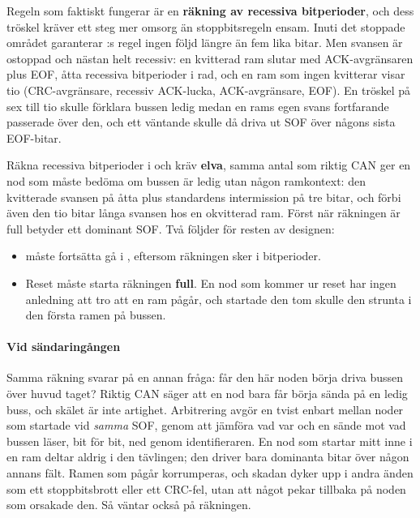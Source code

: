 Regeln som faktiskt fungerar är en \textbf{räkning av recessiva bitperioder}, och dess tröskel kräver
ett steg mer omsorg än stoppbitsregeln ensam. Inuti det stoppade området garanterar
:s regel ingen följd längre än fem lika bitar. Men svansen är ostoppad och
nästan helt recessiv: en kvitterad ram slutar med ACK-avgränsaren plus EOF, åtta recessiva
bitperioder i rad, och en ram som ingen kvitterar visar tio (CRC-avgränsare, recessiv ACK-lucka,
ACK-avgränsare, EOF). En tröskel på sex till tio skulle förklara bussen ledig medan en rams egen svans
fortfarande passerade över den, och ett väntande  skulle då driva ut SOF över någons
sista EOF-bitar.

Räkna recessiva bitperioder i  och kräv \textbf{elva}, samma antal som riktig CAN
ger en nod som måste bedöma om bussen är ledig utan någon ramkontext: den kvitterade svansen på åtta
plus standardens intermission på tre bitar, och förbi även den tio bitar långa svansen hos en
okvitterad ram. Först när räkningen är full betyder ett dominant  SOF. Två följder
för resten av designen:
\begin{itemize}
  \item {} måste fortsätta gå i , eftersom räkningen sker i
    bitperioder.
  \item Reset måste starta räkningen \textbf{full}. En nod som kommer ur reset har ingen anledning
    att tro att en ram pågår, och startade den tom skulle den strunta i den första ramen på bussen.
\end{itemize}

\paragraph{Vid sändaringången}
Samma räkning svarar på en annan fråga: får den här noden börja driva bussen över huvud taget? Riktig
CAN säger att en nod bara får börja sända på en ledig buss, och skälet är inte artighet. Arbitrering
avgör en tvist enbart mellan noder som startade vid \emph{samma} SOF, genom att jämföra vad var och
en sände mot vad bussen läser, bit för bit, ned genom identifieraren. En nod som startar mitt inne i
en ram deltar aldrig i den tävlingen; den driver bara dominanta bitar över någon annans fält. Ramen
som pågår korrumperas, och skadan dyker upp i andra änden som ett stoppbitsbrott eller ett CRC-fel,
utan att något pekar tillbaka på noden som orsakade den. Så  väntar också på räkningen.

